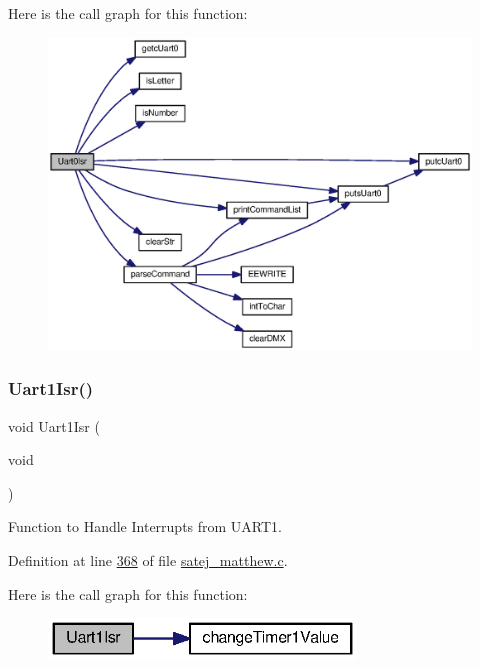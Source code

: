 Here is the call graph for this function\+:
\nopagebreak
\begin{figure}[H]
\begin{center}
\leavevmode
\includegraphics[width=350pt]{tm4c123gh6pm__startup__ccs_8c_affa7c2cc09d04fc57b05c5644b1c8a68_cgraph}
\end{center}
\end{figure}
\mbox{\label{tm4c123gh6pm__startup__ccs_8c_af19c26d9a6dc91ca0e5358bef906f61f}} 
\subsubsection{\texorpdfstring{Uart1Isr()}{Uart1Isr()}}
{\footnotesize\ttfamily void Uart1\+Isr (\begin{DoxyParamCaption}\item[{void}]{ }\end{DoxyParamCaption})}



Function to Handle Interrupts from U\+A\+R\+T1. 



Definition at line \mbox{\hyperlink{satej__matthew_8c_source_l00368}{368}} of file \mbox{\hyperlink{satej__matthew_8c_source}{satej\+\_\+matthew.\+c}}.

Here is the call graph for this function\+:
\nopagebreak
\begin{figure}[H]
\begin{center}
\leavevmode
\includegraphics[width=232pt]{tm4c123gh6pm__startup__ccs_8c_af19c26d9a6dc91ca0e5358bef906f61f_cgraph}
\end{center}
\end{figure}


